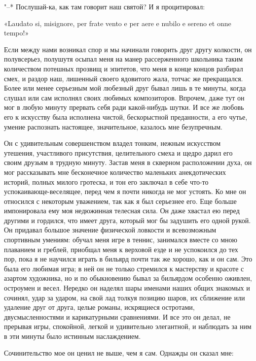 "--* Послушай-ка, как там говорит наш святой? И я процитировал:

«Laudato si, misignore,  per frate vento e per aere  e nubilo e sereno
et onne tempo!»

Если  между нами  возникал  спор  и мы  начинали  говорить друг  другу
колкости, он полувсерьез, полушутя  осыпал меня на манер рассерженного
школьника таким  количеством потешных прозвищ  и эпитетов, что  меня в
конце концов  разбирал смех, и  раздор наш, лишенный  своего ядовитого
жала, тотчас  же прекращался. Более  или менее серьезным  мой любезный
друг  бывал лишь  в те  минуты, когда  слушал или  сам исполнял  своих
любимых композиторов. Впрочем, даже тут он мог в любую минуту прервать
себя ради  какой-нибудь шутки. И  все же  любовь его к  искусству была
исполнена  чистой,  бескорыстной  преданности,  а  его  чутье,  умение
распознать настоящее, значительное, казалось мне безупречным.

Он  с  удивительным  совершенством владел  тонким,  нежным  искусством
утешения, участливого  присутствия, целительного  смеха и  щедро дарил
его  своим   друзьям  в  трудную   минуту.  Застав  меня   в  скверном
расположении  духа, он  мог  рассказывать  мне бесконечное  количество
маленьких анекдотических  историй, полных  милого гротеска, и  тон его
заключал  в  себе что-то  успокаивающе-веселящее,  перед  чем я  почти
никогда не мог устоять. Ко мне он относился с некоторым уважением, так
как я  был серьезнее его.  Еще больше импонировала ему  моя недюжинная
телесная сила. Он даже хвастал ею  перед другими и гордился, что имеет
друга, который  мог бы задушить  его одной рукой. Он  придавал большое
значение физической ловкости и всевозможным спортивным умениям: обучал
меня  игре в  теннис, занимался  вместе со  мною плаванием  и греблей,
приобщал  меня к  верховой  езде  и не  успокоился  до  тех пор,  пока
я  не  научился  играть в  бильярд  почти  так  же  хорошо, как  и  он
сам.  Это была  его  любимая игра;  в  ней он  не  только стремился  к
мастерству и красоте с азартом художника, но и по обыкновению бывал за
бильярдом особенно оживлен, остроумен и весел. Нередко он наделял шары
именами наших  общих знакомых и сочинял,  удар за ударом, на  свой лад
толкуя  позицию  шаров,  их  сближение или  удаление  друг  от  друга,
целые романы, искрящиеся  остротами, двусмысленностями и карикатурными
сравнениями. И все это он делал, не прерывая игры, спокойной, легкой и
удивительно элегантной, и наблюдать за  ним в эти минуты было истинным
наслаждением.

Сочинительство мое он ценил не выше, чем я сам. Однажды он сказал мне:

